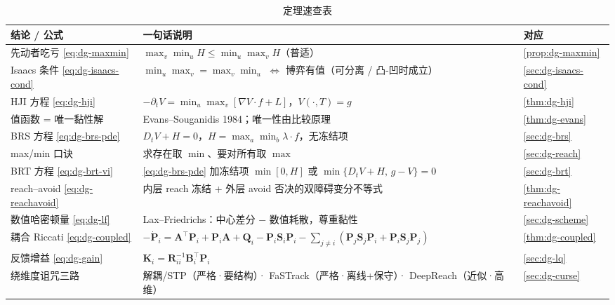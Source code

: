 \begin{table}[H]\centering\small
\caption{定理速查表}
\label{tab:dg-thm-cheat}
\begin{tabular}{lll}
\toprule
结论 / 公式 & 一句话说明 & 对应 \\
\midrule
先动者吃亏 \cref{eq:dg-maxmin} & $\max_v\min_u H\le\min_u\max_v H$（普适） & \cref{prop:dg-maxmin} \\
Isaacs 条件 \cref{eq:dg-isaacs-cond} & $\min_u\max_v=\max_v\min_u$ $\iff$ 博弈有值（可分离 / 凸-凹时成立） & \cref{sec:dg-isaacs-cond} \\
HJI 方程 \cref{eq:dg-hji} & $-\partial_t V=\min_u\max_v[\nabla V\cdot f+L]$，$V(\cdot,T)=g$ & \cref{thm:dg-hji} \\
值函数 = 唯一黏性解 & Evans--Souganidis 1984；唯一性由比较原理 & \cref{thm:dg-evans} \\
BRS 方程 \cref{eq:dg-brs-pde} & $D_tV+H=0$，$H=\max_a\min_b\lambda\cdot f$，无冻结项 & \cref{sec:dg-brs} \\
max/min 口诀 & 求存在取 $\min$、要对所有取 $\max$ & \cref{sec:dg-reach} \\
BRT 方程 \cref{eq:dg-brt-vi} & \cref{eq:dg-brs-pde} 加冻结项 $\min[0,H]$ 或 $\min\{D_tV+H,\,g-V\}=0$ & \cref{sec:dg-brt} \\
reach--avoid \cref{eq:dg-reachavoid} & 内层 reach 冻结 + 外层 avoid 否决的双障碍变分不等式 & \cref{thm:dg-reachavoid} \\
数值哈密顿量 \cref{eq:dg-lf} & Lax--Friedrichs：中心差分 $-$ 数值耗散，尊重黏性 & \cref{sec:dg-scheme} \\
耦合 Riccati \cref{eq:dg-coupled} & $-\dot{\mathbf P}_i=\mathbf A^\top \mathbf P_i+\mathbf P_i\mathbf A+\mathbf Q_i-\mathbf P_i\mathbf S_i\mathbf P_i-\sum_{j\ne i}(\mathbf P_j\mathbf S_j\mathbf P_i+\mathbf P_i\mathbf S_j\mathbf P_j)$ & \cref{thm:dg-coupled} \\
反馈增益 \cref{eq:dg-gain} & $\mathbf K_i=\mathbf R_{ii}^{-1}\mathbf B_i^\top \mathbf P_i$ & \cref{sec:dg-lq} \\
绕维度诅咒三路 & 解耦/STP（严格·要结构）· FaSTrack（严格·离线+保守）· DeepReach（近似·高维） & \cref{sec:dg-curse} \\
\bottomrule
\end{tabular}
\end{table}

